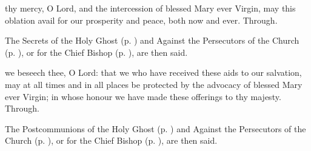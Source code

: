 \secret
{} thy mercy, O Lord, and the intercession of blessed Mary ever Virgin, may this oblation avail for our prosperity and peace, both now and ever. Through.
\begin{rubric}
    The Secrets of the Holy Ghost (p. \pageref{SPHolyGhost}) and Against the Persecutors of the Church (p. \pageref{SPAgainst}), or for the Chief Bishop (p. \pageref{SPChiefBishop}), are then said.
\end{rubric}
\postcommunion
{} we beseech thee, O Lord: that we who have received these aids to our salvation, may at all times and in all places be protected by the advocacy of blessed Mary ever Virgin; in whose honour we have made these offerings to thy majesty. Through.
\begin{rubric}
    The Postcommunions of the Holy Ghost (p. \pageref{SPHolyGhost}) and Against the Persecutors of the Church (p. \pageref{SPAgainst}), or for the Chief Bishop (p. \pageref{SPChiefBishop}), are then said.
\end{rubric}

